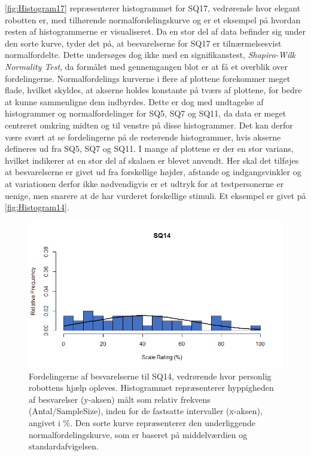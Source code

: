 \noindent
%
\autoref{fig:Histogram17} repræsenterer histogrammet for SQ17, vedrørende hvor elegant robotten er, med tilhørende normalfordelingskurve og er et eksempel på hvordan resten af histogrammerne er visualiseret. Da en stor del af data befinder sig under den sorte kurve, tyder det på, at besvarelserne for SQ17 er tilnærmelsesvist normalfordelte. Dette undersøges dog ikke med en signifikanstest, \textit{Shapiro-Wilk Normality Test}, da formålet med gennemgangen blot er at få et overblik over fordelingerne.\blankline
%
Normalfordelings kurverne i flere af plottene forekommer meget flade, hvilket skyldes, at akserne holdes konstante på tværs af plottene, for bedre at kunne sammenligne dem indbyrdes. Dette er dog med undtagelse af histogrammer og normalfordelinger for SQ5, SQ7 og SQ11, da data er meget centreret omkring midten og til venstre på disse histogrammer. Det kan derfor være svært at se fordelingerne på de resterende histogrammer, hvis akserne defineres ud fra SQ5, SQ7 og SQ11.\blankline
%
I mange af plottene er der en stor varians, hvilket indikerer at en stor del af skalaen er blevet anvendt. Her skal det tilføjes at besvarelserne er givet ud fra forskellige højder, afstande og indgangsvinkler og at variationen derfor ikke nødvendigvis er et udtryk for at testpersonerne er uenige, men snarere at de har vurderet forskellige stimuli. Et eksempel er givet på \autoref{fig:Histogram14}.\blankline
%
\begin{figure}[H]
\centering
\includegraphics[width = \textwidth]{Figure/DatabehandlingSkalaer/HistogramNormalFordeling/SQ14} 
\caption{Fordelingerne af besvarelserne til SQ14, vedrørende hvor personlig robottens hjælp opleves. Histogrammet repræsenterer hyppigheden af besvarelser (y-aksen) målt som relativ frekvens (Antal/SampleSize), inden for de fastsatte intervaller (x-aksen), angivet i \%. Den sorte kurve repræsenterer den underliggende normalfordelingskurve, som er baseret på middelværdien og standardafvigelsen.}
\label{fig:Histogram14}
\end{figure}
